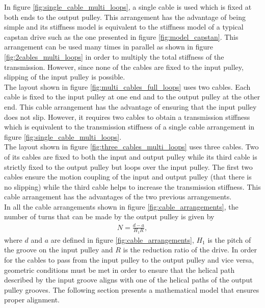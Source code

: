 \documentclass[10pt,cleanfoot]{asme2ej}
\begin{document}
In figure \ref{fig:single_cable_multi_loops}, a single cable is used which is fixed at both ends to the output pulley. This arrangement has the advantage of being simple and its stiffness model is equivalent to the stiffness model of a typical capstan drive such as the one presented in figure \ref{fig:model_capstan}. This arrangement can be used many times in parallel as shown in figure \ref{fig:2cables_multi_loops} in order to multiply the total stiffness of the transmission. However, since none of the cables are fixed to the input pulley, slipping of the input pulley is possible.\\
The layout shown in figure \ref{fig:multi_cables_full_loops} uses two cables. Each cable is fixed to the input pulley at one end and to the output pulley at the other end. This cable arrangement has the advantage of ensuring that the input pulley does not slip. However, it requires two cables to obtain a transmission stiffness which is equivalent to the transmission stiffness of a single cable arrangement in figure \ref{fig:single_cable_multi_loops}.\\
The layout shown in figure  \ref{fig:three_cables_multi_loops} uses three cables. Two of its cables are fixed to both the input and output pulley while its third cable is strictly fixed to the output pulley but loops over the input pulley. The first two cables ensure the motion coupling of the input and output pulley (that there is no slipping) while the third cable helps to increase the transmission stiffness. This cable arrangement has the advantages of the two previous arrangements. \\
In all the cable arrangements shown in figure \ref{fig:cable_arrangements}, the number of turns that can be made by the output pulley is given by 
\begin{align}
N = \frac{d-a}{H_1R},
\end{align}
where  $d$ and $a$ are defined in figure \ref{fig:cable_arrangements}, $H_1$ is the pitch of the groove on the input pulley and $R$ is the reduction ratio of the drive.
In order for the cables to pass from the input pulley to the output pulley and vice versa, geometric conditions must be met in order to ensure that the helical path described by the input groove aligns with one of the helical paths of the output pulley grooves. The following section presents a mathematical model that ensures proper alignment.
\end{document}
